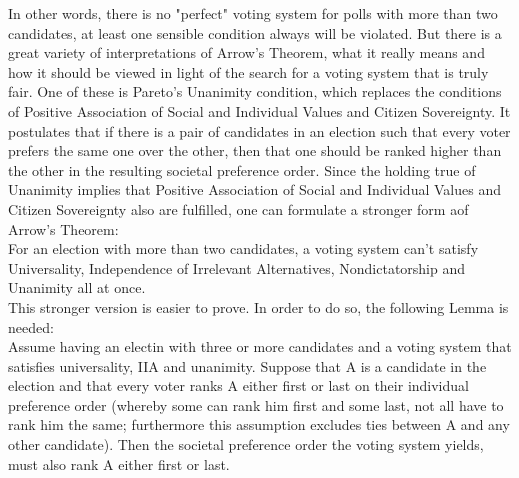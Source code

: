 In other words, there is no "perfect" voting system for polls with more than two candidates, at least one sensible condition always will be violated. But there is a great variety of interpretations of Arrow's Theorem, what it really means and how it should be viewed in light of the search for a voting system that is truly fair. 
One of these is Pareto's Unanimity condition, which replaces the conditions of Positive Association of Social and Individual Values and Citizen Sovereignty. It postulates that if there is a pair of candidates in an election such that every voter prefers the same one over the other, then that one should be ranked higher than the other in the resulting societal preference order. 
Since the holding true of Unanimity implies that Positive Association of Social and Individual Values and Citizen Sovereignty also are fulfilled, one can formulate a stronger form aof Arrow's Theorem: \\
For an election with more than two candidates, a voting system can't satisfy Universality, Independence of Irrelevant Alternatives, Nondictatorship and Unanimity all at once. \\

This stronger version is easier to prove. In order to do so, the following Lemma is needed: \\

Assume having an electin with three or more candidates and a voting system that satisfies universality, IIA and unanimity. Suppose that A is a candidate in the election and that every voter ranks A either first or last on their individual preference order (whereby some can rank him first and some last, not all have to rank him the same; furthermore this assumption excludes ties between A and any other candidate). Then the societal preference order the voting system yields, must also rank A either first or last. \\

